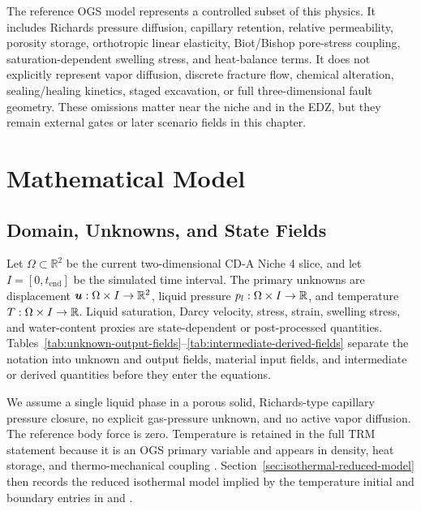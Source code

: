The reference OGS model represents a controlled subset of this physics.  It includes
Richards pressure diffusion, capillary retention, relative permeability, porosity
storage, orthotropic linear elasticity, Biot/Bishop pore-stress coupling,
saturation-dependent swelling stress, and heat-balance terms.  It does not
explicitly represent vapor diffusion, discrete fracture flow, chemical alteration,
sealing/healing kinetics, staged excavation, or full three-dimensional fault
geometry.  These omissions matter near the niche and in the EDZ, but they remain
external gates or later scenario fields in this chapter.

\section{Mathematical Model}
\label{sec:mathematical-model}

\subsection{Domain, Unknowns, and State Fields}
\label{sec:domain-unknowns}

Let \(\Omega\subset\mathbb{R}^2\) be the current two-dimensional CD-A Niche 4 slice,
and let \(I=[0,t_{\mathrm{end}}]\) be the simulated time interval.  The primary
unknowns are displacement \(\bm{u}:\Omega\times I\rightarrow\mathbb{R}^2\), liquid
pressure \(p_l:\Omega\times I\rightarrow\mathbb{R}\), and temperature
\(T:\Omega\times I\rightarrow\mathbb{R}\).  Liquid saturation, Darcy velocity,
stress, strain, swelling stress, and water-content proxies are state-dependent or
post-processed quantities.  Tables~\ref{tab:unknown-output-fields}--\ref{tab:intermediate-derived-fields}
separate the notation into unknown and output fields, material input fields, and
intermediate or derived quantities before they enter the equations.



We assume a single liquid phase in a porous solid, Richards-type capillary pressure
closure, no explicit gas-pressure unknown, and no active vapor diffusion.  The
reference body force is zero.  Temperature is retained in the full TRM statement
because it is an OGS primary variable and appears in density, heat storage, and
thermo-mechanical coupling
\citep[``Governing equations without vapor diffusion'' and ``Process variables'']{OpenGeoSysTRMDocs}.
Section~\ref{sec:isothermal-reduced-model} then records the reduced isothermal
model implied by the temperature initial and boundary entries in
 and .


